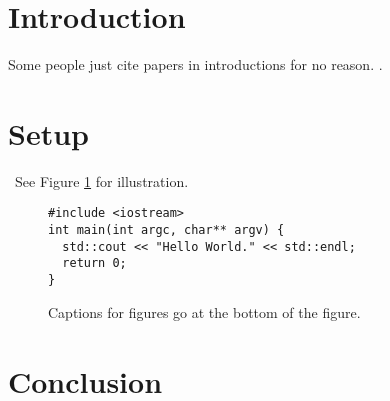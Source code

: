 \section{Introduction}
Some people just cite papers in introductions for no reason.
\citet{ar49,pearson01,spe04}.

\section{Setup}
\label{sec:setup}
\blindmathtrue\blindtext\ See Figure \ref{fig:figure1} for illustration.
\begin{figure}[ht]
  \centering
\begin{verbatim}
#include <iostream>
int main(int argc, char** argv) {
  std::cout << "Hello World." << std::endl;
  return 0;
}
\end{verbatim}
  \caption{Captions for figures go at the bottom of the figure.}
  \label{fig:figure1}
\end{figure}

\section{Conclusion}
\blindmathfalse\blindtext[2]
